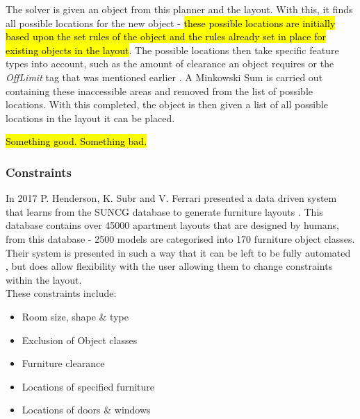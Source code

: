 The solver is given an object from this planner and the layout. With this, it finds all possible locations for the new object - \hl{these possible locations are initially based upon the set rules of the object and the rules already set in place for existing objects in the layout}. The possible locations then take specific feature types into account, such as the amount of clearance an object requires or the \textit{OffLimit} tag that was mentioned earlier \cite{rule-based-layout}. A Minkowski Sum \cite{minkowski} is carried out containing these inaccessible areas and removed from the list of possible locations.
With this completed, the object is then given a list of all possible locations in the layout it can be placed.

\hl{Something good. Something bad.}

\bigskip
\subsubsection{Constraints}
In 2017 P. Henderson, K. Subr and V. Ferrari presented a data driven system that learns from the SUNCG \cite{suncg} database to generate furniture layouts \cite{constrained-layouts}. This database contains over 45000 apartment layouts that are designed by humans, from this database - 2500 models are categorised into 170 furniture object classes.
Their system is presented in such a way that it can be left to be fully automated \cite{constrained-layouts}, but does allow flexibility with the user allowing them to change constraints within the layout.\\
These constraints include:
\begin{itemize}
    \item Room size, shape \& type 
    \item Exclusion of Object classes
    \item Furniture clearance 
    \item Locations of specified furniture
    \item Locations of doors \& windows
\end{itemize}

